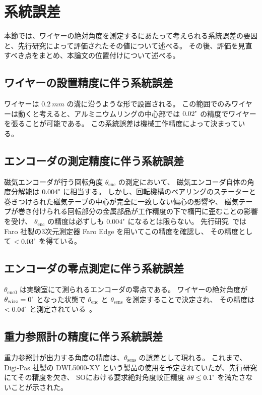 \documentclass[../../main.tex]{subfiles}
\begin{document}
\section{系統誤差}
本節では、ワイヤーの絶対角度を測定するにあたって考えられる系統誤差の要因と、先行研究によって評価されたその値について述べる。
その後、評価を見直すべき点をまとめ、本論文の位置付けについて述べる。
\subsection{ワイヤーの設置精度に伴う系統誤差}
ワイヤーは $\SI{0.2}{mm}$ の溝に沿うような形で設置される。
この範囲でのみワイヤーは動くと考えると、アルミニウムリングの中心部では $0.02\tcdegree$ の精度でワイヤーを張ることが可能である。
この系統誤差は機械工作精度によって決まっている。
\subsection{エンコーダの測定精度に伴う系統誤差}
磁気エンコーダが行う回転角度 $\theta_{\mathrm{enc}}$ の測定において、
磁気エンコーダ自体の角度分解能は $0.004\tcdegree$ に相当する。
しかし、回転機構のベアリングのステーターと巻きつけられた磁気テープの中心が完全に一致しない偏心の影響や、
磁気テープが巻き付けられる回転部分の金属部品が工作精度の下で楕円に歪むことの影響を受け、
$\theta_{\mathrm{enc}}$ の精度は必ずしも $0.004\tcdegree$ になるとは限らない。
先行研究~\cite{swg:iijima}では Faro 社製の3次元測定器 Faro Edge を用いてこの精度を確認し、
その精度として $< 0.03\tcdegree$ を得ている。
\subsection{エンコーダの零点測定に伴う系統誤差}
$\theta_{\mathrm{enc}0}$ は実験室にて測られるエンコーダの零点である。
ワイヤーの絶対角度が $\theta_{\mathrm{wire}} = 0\tcdegree$ となった状態で $\theta_{\mathrm{enc}}$ と $\theta_{\mathrm{sens}}$ を測定することで決定され、
その精度は $< 0.04\tcdegree$ と測定されている~\cite{swg:iijima}。\\

\subsection{重力参照計の精度に伴う系統誤差}
重力参照計が出力する角度の精度は、$\theta_{\mathrm{sens}}$ の誤差として現れる。
これまで、Digi-Pas 社製の DWL5000-XY という製品の使用を予定されていたが、先行研究\cite{swg:iijima}にてその精度を欠き、
SOにおける要求絶対角度較正精度 $\delta\theta \leq 0.1\tcdegree$ を満たさないことが示された。
\end{document}
